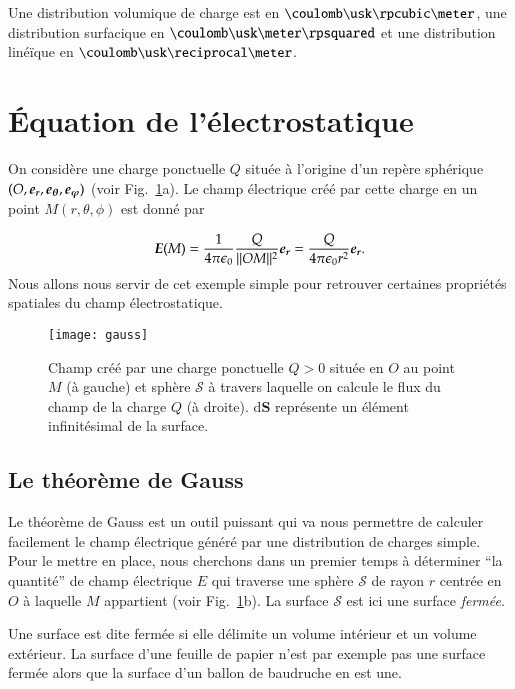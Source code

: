 \begin{attention}
	Une distribution volumique de charge est en $\coulomb \usk \rpcubic \meter$,
	une distribution surfacique en $\coulomb \usk \meter \rpsquared$
	et une distribution linéïque en $\coulomb \usk \reciprocal \meter$.
\end{attention}

\section{Équation de l'électrostatique}
On considère une charge ponctuelle $Q$ située à l'origine d'un repère sphérique
$(O, \er, \etheta, \ephi)$ (voir Fig.~\ref{fig:gauss}a). Le champ électrique créé 
par cette charge en 
un point $M(r, \theta, \phi)$ est donné par

\begin{equation*}
	\vece(M) = \pieps \dfrac{Q}{||OM||^2}\er 
	         = \dfrac{Q}{4\pi\epsilon_0 r^2}\er.
\end{equation*}
Nous allons nous servir de cet exemple simple pour retrouver certaines propriétés
spatiales du champ électrostatique.

\begin{figure}
	\centering
	\texttt{[image: gauss]}
	\caption{Champ créé par une charge ponctuelle $Q > 0$ située en 
		 $O$ au point $M$ (à gauche) et sphère $\mathcal{S}$ à travers
	 	 laquelle on calcule le flux du champ de la charge $Q$ (à droite).
	         $\mathrm{d}\mathbf{S}$ représente un élément infinitésimal 
	 	 de la surface.}%
	\label{fig:gauss}
\end{figure}

\subsection{Le théorème de Gauss}
\label{sec:gauss}
Le théorème de Gauss est un outil puissant qui va nous permettre de calculer
facilement le champ électrique généré par une distribution de charges simple.
Pour le mettre en place, nous
cherchons dans un premier temps à déterminer ``la quantité'' de champ électrique 
$E$ qui traverse une
sphère $\mathcal{S}$ de rayon $r$ centrée en $O$ à laquelle $M$ 
appartient (voir Fig.~\ref{fig:gauss}b). 
La surface $\mathcal{S}$ est ici une surface \emph{fermée}.

\begin{defn}
	Une surface est dite fermée si elle délimite un volume intérieur 
	et un volume extérieur. La surface d'une feuille de papier n'est par 
	exemple pas une surface fermée alors que la surface d'un ballon de baudruche
	en est une.
\end{defn}

